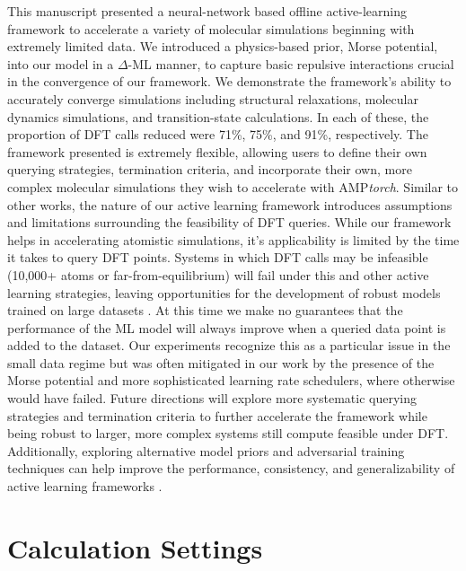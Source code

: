 \documentclass[
 reprint,
 amsmath,
 amssymb,
 aps,
]{revtex4-1}
\begin{document}
This manuscript presented a neural-network based offline active-learning framework to accelerate a variety of molecular simulations beginning with extremely limited data. We introduced a physics-based prior, Morse potential, into our model in a $\Delta$-ML manner, to capture basic repulsive interactions crucial in the convergence of our framework. We demonstrate the framework's ability to accurately converge simulations including structural relaxations, molecular dynamics simulations, and transition-state calculations. In each of these, the proportion of DFT calls reduced were 71\%, 75\%, and 91\%, respectively. The framework presented is extremely flexible, allowing users to define their own querying strategies, termination criteria, and incorporate their own, more complex molecular simulations they wish to accelerate with AMP\textit{torch}. Similar to other works, the nature of our active learning framework introduces assumptions and limitations surrounding the feasibility of DFT queries. While our framework helps in accelerating atomistic simulations, it's applicability is limited by the time it takes to query DFT points. Systems in which DFT calls may be infeasible (10,000+ atoms or far-from-equilibrium) will fail under this and other active learning strategies, leaving opportunities for the development of robust models trained on large datasets \cite{ocp}. At this time we make no guarantees that the performance of the ML model will always improve when a queried data point is added to the dataset. Our experiments recognize this as a particular issue in the small data regime but was often mitigated in our work by the presence of the Morse potential and more sophisticated learning rate schedulers, where otherwise would have failed. Future directions will explore more systematic querying strategies and termination criteria to further accelerate the framework while being robust to larger, more complex systems still compute feasible under DFT. Additionally, exploring alternative model priors and adversarial training techniques can help improve the performance, consistency, and generalizability of active learning frameworks \cite{fan2020adversarial, steinhardt2017certified}. 
\section{Calculation Settings}
\end{document}
